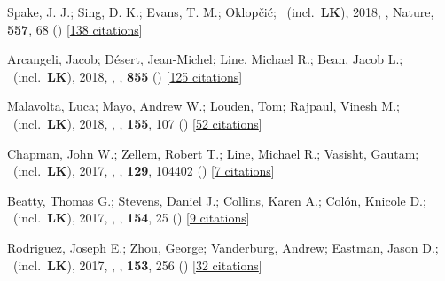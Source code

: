 \item[{\color{numcolor}\scriptsize19}] Spake, J. J.; Sing, D. K.; Evans, T. M.; Oklop{\v{c}}i{\'c}; \etal\ (incl.\ \textbf{LK}), 2018, , Nature, \textbf{557}, 68 () [\href{https://ui.adsabs.harvard.edu/abs/2018Natur.557...68S}{138 citations}]

\item[{\color{numcolor}\scriptsize18}] Arcangeli, Jacob; D{\'e}sert, Jean-Michel; Line, Michael R.; Bean, Jacob L.; \etal\ (incl.\ \textbf{LK}), 2018, , \apj, \textbf{855} () [\href{https://ui.adsabs.harvard.edu/abs/2018ApJ...855L..30A}{125 citations}]

\item[{\color{numcolor}\scriptsize17}] Malavolta, Luca; Mayo, Andrew W.; Louden, Tom; Rajpaul, Vinesh M.; \etal\ (incl.\ \textbf{LK}), 2018, , \aj, \textbf{155}, 107 () [\href{https://ui.adsabs.harvard.edu/abs/2018AJ....155..107M}{52 citations}]

\item[{\color{numcolor}\scriptsize16}] Chapman, John W.; Zellem, Robert T.; Line, Michael R.; Vasisht, Gautam; \etal\ (incl.\ \textbf{LK}), 2017, , \pasp, \textbf{129}, 104402 () [\href{https://ui.adsabs.harvard.edu/abs/2017PASP..129j4402C}{7 citations}]

\item[{\color{numcolor}\scriptsize15}] Beatty, Thomas G.; Stevens, Daniel J.; Collins, Karen A.; Col{\'o}n, Knicole D.; \etal\ (incl.\ \textbf{LK}), 2017, , \aj, \textbf{154}, 25 () [\href{https://ui.adsabs.harvard.edu/abs/2017AJ....154...25B}{9 citations}]

\item[{\color{numcolor}\scriptsize14}] Rodriguez, Joseph E.; Zhou, George; Vanderburg, Andrew; Eastman, Jason D.; \etal\ (incl.\ \textbf{LK}), 2017, , \aj, \textbf{153}, 256 () [\href{https://ui.adsabs.harvard.edu/abs/2017AJ....153..256R}{32 citations}]

